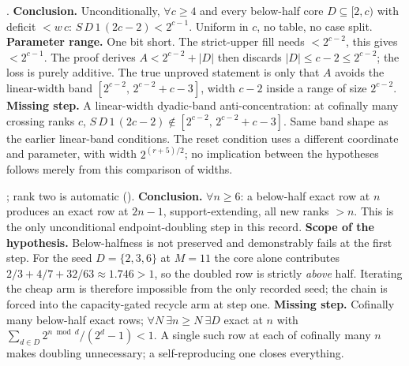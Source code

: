\begin{obs}
.
\textbf{Conclusion.} Unconditionally, $\forall c \ge 4$ and every below-half core $D \subseteq [2,c)$
with deficit $< \ensuremath{w}\,c$: $\ensuremath{S}\,D\,1\,(2c{-}2) <
2^{c-1}$. Uniform in $c$, no table, no case split.
\textbf{Parameter range.} One bit short. The strict-upper fill needs
$<2^{c-2}$, this gives $<2^{c-1}$. The proof derives $A < 2^{c-2}+|D|$ then discards
$|D| \le c-2 \le 2^{c-2}$; the loss is purely additive. The true unproved statement is only that
$A$ avoids the linear-width band $[2^{c-2},\,2^{c-2}+c-3]$, width $c{-}2$ inside a range of size
$2^{c-2}$.
\textbf{Missing step.} A linear-width dyadic-band anti-concentration: at cofinally many crossing
ranks $c$, $\ensuremath{S}\,D\,1\,(2c{-}2) \notin [2^{c-2},\,2^{c-2}+c-3]$. Same band
shape as the earlier linear-band conditions.  The reset condition
uses a different coordinate and parameter, with width $2^{(r+5)/2}$;
no implication between the hypotheses follows merely from this
comparison of widths.
\end{obs}

\begin{obs}
;
rank two is automatic
().
\textbf{Conclusion.} $\forall n \ge 6$: a below-half exact row at $n$ produces an exact row at
$2n{-}1$, support-extending, all new ranks $>n$.  This is the only unconditional
endpoint-doubling step in this record.
\textbf{Scope of the hypothesis.} Below-halfness is not preserved and
demonstrably fails at the first step. For the seed $D=\{2,3,6\}$ at $M=11$ the core alone
contributes $2/3+4/7+32/63 \approx 1.746 > 1$, so the doubled row is strictly \emph{above} half.
Iterating the cheap arm is therefore impossible from the only recorded seed; the chain is forced
into the capacity-gated recycle arm at step one.
\textbf{Missing step.} Cofinally many below-half exact rows; $\forall N\ \exists n \ge N\ \exists D$
exact at $n$ with $\sum_{d\in D}2^{n\bmod d}/(2^d-1) < 1$. A single such row at each of cofinally
many $n$ makes doubling unnecessary; a self-reproducing one closes everything.
\end{obs}

